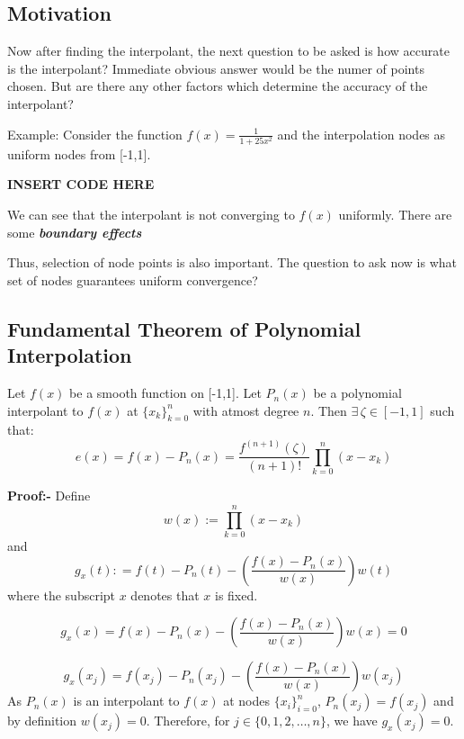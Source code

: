 \documentclass[
]{book}
\begin{document}
\hypertarget{motivation-1}{%
\subsection{Motivation}\label{motivation-1}}

Now after finding the interpolant, the next question to be asked is how accurate is the interpolant? Immediate obvious answer would be the numer of points chosen. But are there any other factors which determine the accuracy of the interpolant?

Example: Consider the function \(f(x) = \frac{1}{1+25x^2}\) and the interpolation nodes as uniform nodes from {[}-1,1{]}.

\textbf{INSERT CODE HERE}

We can see that the interpolant is not converging to \(f(x)\) uniformly. There are some \textbf{\emph{boundary effects}}

Thus, selection of node points is also important. The question to ask now is what set of nodes guarantees uniform convergence?

\hypertarget{fundamental-theorem-of-polynomial-interpolation}{%
\subsection{Fundamental Theorem of Polynomial Interpolation}\label{fundamental-theorem-of-polynomial-interpolation}}

Let \(f(x)\) be a smooth function on {[}-1,1{]}. Let \(P_n(x)\) be a polynomial interpolant to \(f(x)\) at \(\{x_k\}_{k=0}^n\) with atmost degree \(n\). Then \(\exists \, \zeta\in[-1,1]\) such that:
\begin{equation}
e(x) = f(x)-P_n(x) = \frac{f^{(n+1)}(\zeta)}{(n+1)!}\prod_{k=0}^n(x-x_k)
\end{equation}

\textbf{Proof:-}
Define \[w(x) := \prod_{k=0}^n(x-x_k)\] and
\begin{equation}
g_x(t) : = f(t)-P_n(t)-\left(\frac{f(x)-P_n(x)}{w(x)}\right)w(t)
\end{equation}
where the subscript \(x\) denotes that \(x\) is fixed.

\[g_x(x) = f(x)-P_n(x)-\left(\frac{f(x)-P_n(x)}{w(x)}\right)w(x) = 0\]

\[g_x(x_j) = f(x_j)-P_n(x_j)-\left(\frac{f(x)-P_n(x)}{w(x)}\right)w(x_j)\]
As \(P_n(x)\) is an interpolant to \(f(x)\) at nodes \(\{x_i\}_{i=0}^n\), \(P_n(x_j) = f(x_j)\) and by definition \(w(x_j) =0\). Therefore, for \(j\in\{0,1,2,\dots ,n\}\), we have \(g_x(x_j)=0\).
\end{document}
